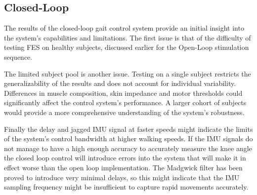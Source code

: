 \subsection{Closed-Loop}

The results of the closed-loop gait control system provide an initial insight into the system's capabilities and limitations. The first issue is that of the difficulty of testing FES on healthy subjects, discussed earlier for the Open-Loop stimulation sequence.

The limited subject pool is another issue. Testing on a single subject restricts the generalizability of the results and does not account for individual variability. Differences in muscle composition, skin impedance and motor thresholds could significantly affect the control system's performance. A larger cohort of subjects would provide a more comprehensive understanding of the system's robustness.

Finally the delay and jagged IMU signal at faster speeds might indicate the limits of the system's control bandwidth at higher walking speeds. If the IMU signals do not manage to have a high enough accuracy to accurately measure the knee angle the closed loop control will introduce errors into the system that will make it in effect worse than the open loop implementation. The Madgwick filter has been proved to introduce very minimal delays, so this might indicate that the IMU sampling frequency might be insufficient to capture rapid movements accurately. 


